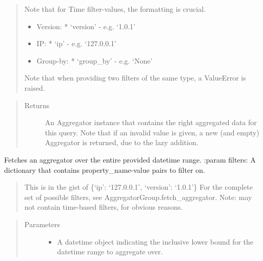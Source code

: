 \documentclass[letterpaper,10pt,english]{sphinxmanual}
\begin{document}
\begin{fulllineitems}
\begin{fulllineitems}
\begin{quote}
\begin{description}
\begin{itemize}
\end{itemize}

Note that for Time filter-values, the formatting is crucial.
\begin{itemize}
\item {} 
Version:
* ‘version’ - e.g. ‘1.0.1’

\item {} 
IP:
* ‘ip’ - e.g. ‘127.0.0.1’

\item {} 
Group-by:
* ‘group\_by’ - e.g. ‘None’

\end{itemize}

\end{description}

Note that when providing two filters of the same type, a ValueError is raised.
\end{quote}
\begin{quote}\begin{description}
\item[{Returns}] \leavevmode
An Aggregator instance that contains the right aggregated data for this query.
Note that if an invalid value is given, a new (and empty) Aggregator is returned, due to the lazy addition.

\end{description}\end{quote}

\end{fulllineitems}


\begin{fulllineitems}
\label{\detokenize{pydash_app.dashboard.aggregator.aggregator_group:pydash_app.dashboard.aggregator.aggregator_group.AggregatorGroup.fetch_aggregator_daterange}}
Fetches an aggregator over the entire provided datetime range.
:param filters: A dictionary that contains property\_name-value pairs to filter on.
\begin{quote}

This is in the gist of \{‘ip’: ‘127.0.0.1’, ‘version’: ‘1.0.1’\}
For the complete set of possible filters, see AggregatorGroup.fetch\_aggregator.
Note: may not contain time-based filters, for obvious reasons.
\end{quote}
\begin{quote}\begin{description}
\item[{Parameters}] \leavevmode\begin{itemize}
\item {} 
 \textendash{} A datetime object indicating the inclusive lower bound for the datetime range to
aggregate over.


\end{itemize}
\end{description}
\end{quote}
\end{fulllineitems}
\end{fulllineitems}
\end{document}

